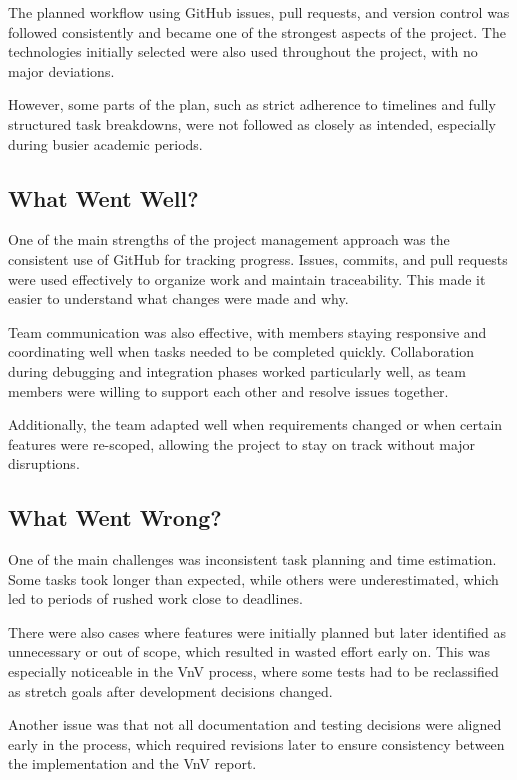\documentclass[12pt, titlepage]{article}
\begin{document}
The planned workflow using GitHub issues, pull requests, and version control was followed consistently and became one of the strongest aspects of the project. The technologies initially selected were also used throughout the project, with no major deviations.

However, some parts of the plan, such as strict adherence to timelines and fully structured task breakdowns, were not followed as closely as intended, especially during busier academic periods.

\subsection{What Went Well?}

One of the main strengths of the project management approach was the consistent use of GitHub for tracking progress. Issues, commits, and pull requests were used effectively to organize work and maintain traceability. This made it easier to understand what changes were made and why.

Team communication was also effective, with members staying responsive and coordinating well when tasks needed to be completed quickly. Collaboration during debugging and integration phases worked particularly well, as team members were willing to support each other and resolve issues together.

Additionally, the team adapted well when requirements changed or when certain features were re-scoped, allowing the project to stay on track without major disruptions.

\subsection{What Went Wrong?}

One of the main challenges was inconsistent task planning and time estimation. Some tasks took longer than expected, while others were underestimated, which led to periods of rushed work close to deadlines.

There were also cases where features were initially planned but later identified as unnecessary or out of scope, which resulted in wasted effort early on. This was especially noticeable in the VnV process, where some tests had to be reclassified as stretch goals after development decisions changed.

Another issue was that not all documentation and testing decisions were aligned early in the process, which required revisions later to ensure consistency between the implementation and the VnV report.
\end{document}
